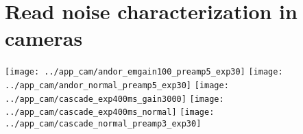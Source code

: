 \chapter{Read noise characterization in cameras}
\texttt{[image: ../app\_cam/andor\_emgain100\_preamp5\_exp30]}
\texttt{[image: ../app\_cam/andor\_normal\_preamp5\_exp30]}
\texttt{[image: ../app\_cam/cascade\_exp400ms\_gain3000]}
\texttt{[image: ../app\_cam/cascade\_exp400ms\_normal]}
\texttt{[image: ../app\_cam/cascade\_normal\_preamp3\_exp30]}
